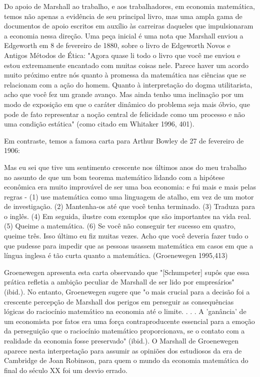 \documentclass[a4paper,12pt]{article}[abntex2]
\begin{document}
Do apoio de Marshall ao trabalho, e aos trabalhadores, em economia matemática, temos não apenas a evidência de seu principal livro, mas uma ampla gama de documentos de apoio escritos em auxílio às carreiras daqueles que impulsionaram a economia nessa direção. Uma peça inicial é uma nota que Marshall enviou a Edgeworth em 8 de fevereiro de 1880, sobre o livro de Edgeworth Novos e Antigos Métodos de Ética: "Agora quase li todo o livro que você me enviou e estou extremamente encantado com muitas coisas nele. Parece haver um acordo muito próximo entre nós quanto à promessa da matemática nas ciências que se relacionam com a ação do homem. Quanto à interpretação do dogma utilitarista, acho que você fez um grande avanço. Mas ainda tenho uma inclinação por um modo de exposição em que o caráter dinâmico do problema seja mais óbvio, que pode de fato representar a noção central de felicidade como um processo e não uma condição estática" (como citado em Whitaker 1996, 401).

Em contraste, temos a famosa carta para Arthur Bowley de 27 de fevereiro de 1906:

Mas eu sei que tive um sentimento crescente nos últimos anos do meu trabalho no assunto de que um bom teorema matemático lidando com a hipótese econômica era muito improvável de ser uma boa economia: e fui mais e mais pelas regras - (1) use matemática como uma linguagem de atalho, em vez de um motor de investigação. (2) Mantenha-os até que você tenha terminado. (3) Traduza para o inglês. (4) Em seguida, ilustre com exemplos que são importantes na vida real. (5) Queime a matemática. (6) Se você não conseguir ter sucesso em quatro, queime três. Isso último eu fiz muitas vezes. Acho que você deveria fazer tudo o que pudesse para impedir que as pessoas usassem matemática em casos em que a língua inglesa é tão curta quanto a matemática. (Groenewegen 1995,413)

Groenewegen apresenta esta carta observando que "[Schumpeter] supôs que essa prática refletia a ambição peculiar de Marshall de ser lido por empresários" (ibid.). No entanto, Groenewegen sugere que "o mais crucial para a decisão foi a crescente percepção de Marshall dos perigos em perseguir as consequências lógicas do raciocínio matemático na economia até o limite. . . . A 'ganância' de um economista por fatos era uma força contraproducente essencial para a emoção da perseguição que o raciocínio matemático proporcionava, se o contato com a realidade da economia fosse preservado" (ibid.). O Marshall de Groenewegen aparece nesta interpretação para assumir as opiniões dos estudiosos da era de Cambridge de Joan Robinson, para quem o mundo da economia matemática do final do século XX foi um desvio errado.
\end{document}
